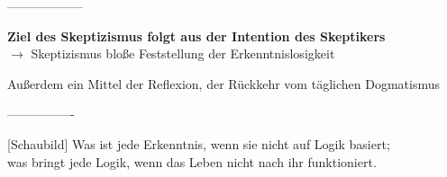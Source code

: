 \documentclass[12pt,a4paper]{article}
\begin{document}
------------------

\textbf{Ziel des Skeptizismus folgt aus der Intention des Skeptikers}\\
$\rightarrow$ Skeptizismus bloße Feststellung der Erkenntnislosigkeit\\
\begin{center}
Außerdem ein Mittel der Reflexion, der Rückkehr vom täglichen Dogmatismus
\end{center}

----------------

[Schaubild]
\glqq Was ist jede Erkenntnis, wenn sie nicht auf Logik basiert;\\
was bringt jede Logik, wenn das Leben nicht nach ihr funktioniert.\grqq\
\end{document}
